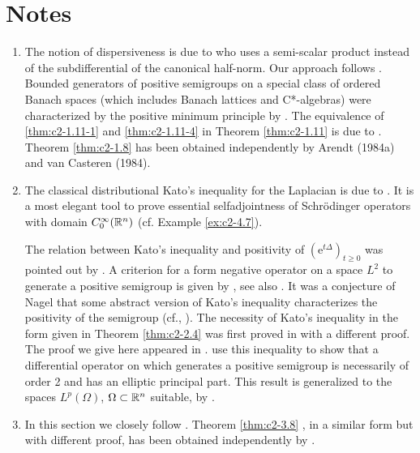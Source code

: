 \section*{Notes}

\begin{enumerate}[label=\emph{Section \arabic*:}, wide]
\item   The notion of dispersiveness is due to \citet{phillips:1962} who uses a semi-scalar product instead of the subdifferential of the canonical half-norm.
Our approach follows \citet{arendtchernoffkato:1982}.
Bounded generators of positive semigroups on a special class of ordered Banach spaces (which includes Banach lattices and C*-algebras) were characterized by the positive minimum principle by \citet{evanshancheolsen:1979}.
The equivalence of \ref{thm:c2-1.11-1} and \ref{thm:c2-1.11-4}  in Theorem \ref{thm:c2-1.11}  is due to \citet{nageluhlig:1981}.
Theorem \ref{thm:c2-1.8}   has been obtained independently by Arendt (1984a) and van Casteren (1984).

\item  
The classical distributional Kato's inequality for the Laplacian is due to \citet{kato:1973}.
It is a most elegant tool to prove essential selfadjointness of Schrödinger operators with domain $C^{\infty}_0(\mathbb{R}^n)$ (cf. Example \ref{ex:c2-4.7}).

The relation between Kato's inequality and positivity of $(\mathrm{e}^{t\Delta})_{t \geq 0}$ was pointed out by \citet{simon:1977}.
A criterion for a form negative operator on a space $L^{2}$ to generate a positive semigroup is given by \citet{beurlingdeny:1958}, see also \citet[Vol. IV, Section XIII.12]{reedsimon:1978}.
It was a conjecture of Nagel that some abstract version of
Kato's inequality characterizes the positivity of the semigroup (cf., \citet{nageluhlig:1981}). The necessity of Kato's inequality in the form given in Theorem \ref{thm:c2-2.4}   was first proved in \citet[Remark 3.10]{arendt:1982} with a different proof. 
The proof we give here appeared in \citet{arendt:1984a}. 
\citet{miyajimaokazawa:1984} use this inequality to show that a differential operator on which generates a positive semigroup is necessarily of order 2 and has an elliptic principal part. 
This result is generalized to the spaces $L^p(\Omega)$, $\Omega \subset \mathbb{R}^n$ suitable, by \citet{miyajima:1986}.

\item  In this section we closely follow \citet{arendt:1984a}. Theorem \ref{thm:c2-3.8}  , in a similar form but with different proof, has been obtained independently by \citet{schep:1985}.


\end{enumerate}
